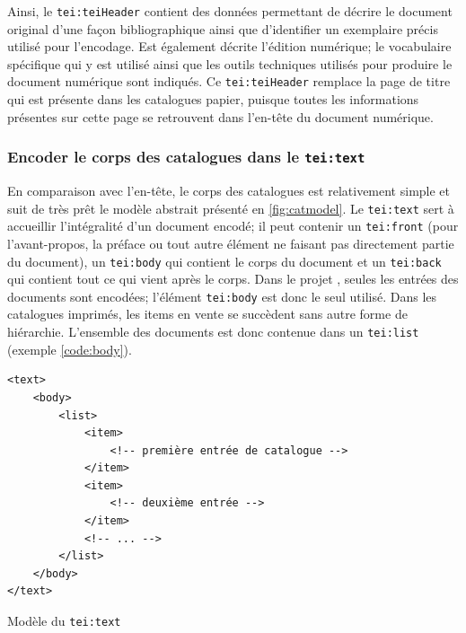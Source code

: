 Ainsi, le \texttt{tei:teiHeader} contient des données permettant de décrire le document original d'une façon bibliographique ainsi que d'identifier un exemplaire précis utilisé pour l'encodage. Est également décrite l'édition numérique; le vocabulaire spécifique qui y est utilisé ainsi que les outils techniques utilisés pour produire le document numérique sont indiqués. Ce \texttt{tei:teiHeader} remplace la page de titre qui est présente dans les catalogues papier, puisque toutes les informations présentes sur cette page se retrouvent dans l'en-tête du document numérique.

\subsubsection{Encoder le corps des catalogues dans le \texttt{tei:text}}
En comparaison avec l'en-tête, le corps des catalogues est relativement simple et suit de très prêt le modèle abstrait présenté en \ref{fig:catmodel}. Le \texttt{tei:text} sert à accueillir l'intégralité d'un document encodé; il peut contenir un \texttt{tei:front} (pour l'avant-propos, la préface ou tout autre élément ne faisant pas directement partie du document), un \texttt{tei:body} qui contient le corps du document et un \texttt{tei:back} qui contient tout ce qui vient après le corps. Dans le projet \mssktb{}, seules les entrées des documents sont encodées; l'élément \texttt{tei:body} est donc le seul utilisé. Dans les catalogues imprimés, les items en vente se succèdent sans autre forme de hiérarchie. L'ensemble des documents est donc contenue dans un \texttt{tei:list} (exemple \ref{code:body}).

\begin{listing}[h]
	\begin{verbatim}
<text>
	<body>
		<list>
			<item>
				<!-- première entrée de catalogue -->
			</item>
			<item>
				<!-- deuxième entrée -->
			</item>
			<!-- ... -->
		</list>
	</body>
</text>
	\end{verbatim}
	\caption{Modèle du \texttt{tei:text}}
	\label{code:body}
\end{listing}

